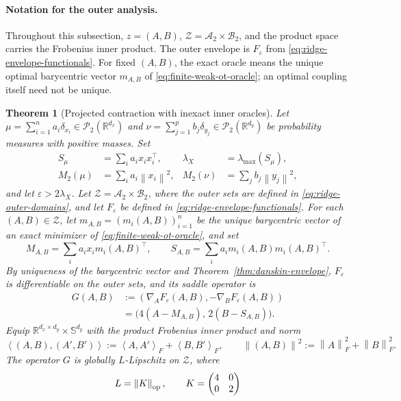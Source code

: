 \documentclass[11pt]{article}
\newcommand{\R}{\mathbb R}
\newcommand{\cP}{\mathcal P}
\newcommand{\ip}[2]{\left\langle #1,#2\right\rangle}
\newcommand{\norm}[1]{\left\lVert #1\right\rVert}
\theoremstyle{plain}
\newtheorem{theorem}{Theorem}[section]
\theoremstyle{definition}
\theoremstyle{remark}
\begin{document}
\paragraph{Notation for the outer analysis.}
Throughout this subsection, \(z=(A,B)\),
\(\mathcal Z=\mathcal A_2\times\mathcal B_2\), and the product space carries
the Frobenius inner product. The outer envelope is \(F_\varepsilon\) from
\eqref{eq:ridge-envelope-functionals}. For fixed \((A,B)\), the exact oracle
means the unique optimal barycentric vector \(m_{A,B}\) of
\eqref{eq:finite-weak-ot-oracle}; an optimal coupling itself need not be unique.

\begin{theorem}[Projected contraction with inexact inner oracles]\label{thm:convergence}
Let \(\mu=\sum_{i=1}^n a_i\delta_{x_i}\in\cP_2(\R^{d_x})\) and
\(\nu=\sum_{j=1}^p b_j\delta_{y_j}\in\cP_2(\R^{d_y})\) be probability
measures with positive masses. Set
\[
\begin{aligned}
 S_\mu&=\sum_i a_i x_ix_i^\top,
 &\lambda_X&=\lambda_{\max}(S_\mu),\\
 M_2(\mu)&=\sum_i a_i\norm{x_i}^2,
 &M_2(\nu)&=\sum_j b_j\norm{y_j}^2,
\end{aligned}
\]
and let \(\varepsilon>2\lambda_X\). Let
\(\mathcal Z=\mathcal A_2\times\mathcal B_2\), where the outer sets are defined
in \eqref{eq:ridge-outer-domains}, and let \(F_\varepsilon\) be defined in
\eqref{eq:ridge-envelope-functionals}. For each \((A,B)\in\mathcal Z\), let
\(m_{A,B}=(m_i(A,B))_{i=1}^n\) be the unique barycentric vector of an exact
minimizer of \eqref{eq:finite-weak-ot-oracle}, and set
\[
 M_{A,B}=\sum_i a_i x_i m_i(A,B)^\top,\qquad
 S_{A,B}=\sum_i a_i m_i(A,B)m_i(A,B)^\top.
\]
By uniqueness of the barycentric vector and
Theorem~\ref{thm:danskin-envelope}, \(F_\varepsilon\) is differentiable on the outer sets, and
its saddle operator is
\[
\begin{aligned}
 G(A,B)
 &:=(\nabla_A F_\varepsilon(A,B),-\nabla_B F_\varepsilon(A,B))\\
 &=\bigl(4(A-M_{A,B}),\,2(B-S_{A,B})\bigr).
\end{aligned}
\]
Equip \(\R^{d_x\times d_y}\times\mathbb S^{d_y}\) with the product Frobenius
inner product and norm
\[
 \ip{(A,B)}{(A',B')}
 :=\ip{A}{A'}_F+\ip{B}{B'}_F,
 \qquad
 \norm{(A,B)}^2:=\norm A_F^2+\norm B_F^2.
\]
The operator \(G\) is globally \(L\)-Lipschitz on \(\mathcal Z\), where
\[
 L=\norm{K}_{\rm op},\qquad
 K=\begin{pmatrix}4&0\\0&2\end{pmatrix}
\]
\end{theorem}
\end{document}

